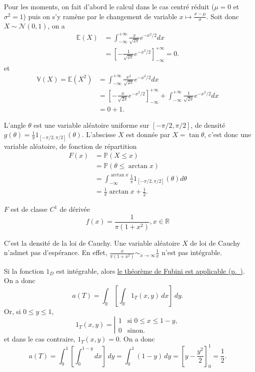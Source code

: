 Pour les moments, on fait d'abord le calcul dans le cas centré réduit
(\(\mu = 0\) et \(\sigma^2 =1\)) puis on s'y ramène par le changement de
variable \(x \mapsto \frac{x-\mu}{\sigma}\). Soit donc
\(X \sim \mathcal{N}(0,1)\), on a \begin{align*}
\mathbb{E}(X) &= \int_{-\infty}^{+\infty} \frac{x}{\sqrt{2\pi}} e^{-x^2/2} dx\\
         &= \left[-\frac{1}{\sqrt{2\pi}} e^{-x^2/2} \right]_{-\infty}^{+\infty} = 0.
\end{align*} et \begin{align*}
\mathbb{V}(X) = \mathbb{E}(X^2) &= \int_{-\infty}^{+\infty} \frac{x^2}{\sqrt{2\pi}} e^{-x^2/2} dx\\
         &= \left[-\frac{x}{\sqrt{2\pi}} e^{-x^2/2} \right]_{-\infty}^{+\infty} +\int_{-\infty}^{+\infty} \frac{1}{\sqrt{2\pi}} e^{-x^2/2} dx \\
         &= 0 + 1.
\end{align*}

\label{II-answer-exo-cauchy}
L'angle \(\theta\) est une variable aléatoire uniforme sur
\([-\pi/2,\pi/2]\), de densité
\(g(\theta) = \frac{1}{\pi}1_{[ -\pi/2,\pi/2 ]}(\theta)\). L'abscisse
\(X\) est donnée par \(X = \tan \theta\), c'est donc une variable
aléatoire, de fonction de répartition \begin{align*}        
F(x) & = \mathbb{P}(X \leq x) \\
     & = \mathbb{P}(\theta \leq \arctan x) \\
     & = \int_{-\infty}^{\arctan x} \frac{1}{\pi}1_{[ -\pi/2,\pi/2 ]}(\theta) d\theta \\
     & = \frac{1}{\pi} \arctan x + \frac{1}{2}.
\end{align*}

\(F\) est de classe \(C^1\) de dérivée
\[f(x) = \frac{1}{\pi(1+x^2)}, x \in \mathbb{R}\]

C'est la densité de la loi de Cauchy. Une variable aléatoire \(X\) de
loi de Cauchy n'admet pas d'espérance. En effet,
\(\frac{x}{\pi(1+x^2)} \sim_{x\to \infty} \frac{1}{x}\) n'est pas
intégrable.

\label{II-answer-triangle}
Si la fonction \(1_D\) est intégrable, alors
\protect\hyperref[II-fubiniproba]{le théorème de Fubini est
applicable (p.~\pageref*{II-fubiniproba})}. On a donc \[
a(T) = \int_{\mathbb{R}}\left[ \int_{\mathbb{R}} 1_T(x, y) \, dx \right] \, dy.
\] Or, si \(0 \leq y \leq 1\), \[
1_T(x, y) = \left| 
\begin{array}{rl}
1 & \mbox{si $0 \leq x \leq 1-y$,} \\
0 & \mbox{sinon.}
\end{array}
\right.
\] et dans le cas contraire, \(1_T(x, y) = 0\). On a donc \[
a(T) = \int_0^1\left[ \int_0^{1-y} dx \right] \, dy
=\int_0^1 (1 - y) \, dy= \left[y - \frac{y^2}{2} \right]_0^1 = \frac{1}{2}.
\]

